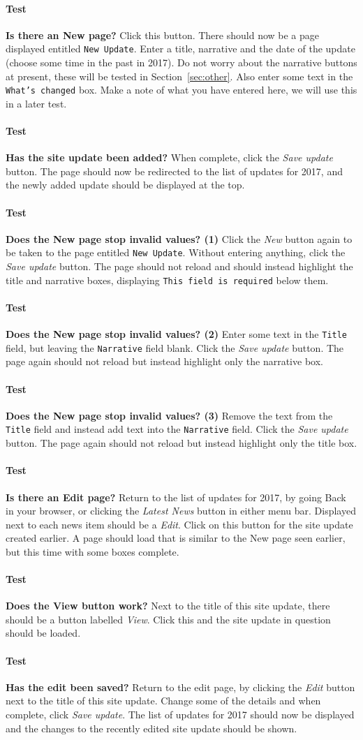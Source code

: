 \documentclass[12pt]{article}
\newcounter{Test}
\newcommand{\test}[1]{%
\stepcounter{Test}%
\paragraph{Test \theTest} \textbf{#1} }
\begin{document}
\test{Is there an New page?}
Click this button. There should now be a page displayed entitled \texttt{New Update}. Enter a title, narrative and the date of the update (choose some time in the past in 2017). Do not worry about the narrative buttons at present, these will be tested in Section~\ref{sec:other}. Also enter some text in the \texttt{What's changed} box. Make a note of what you have entered here, we will use this in a later test.

\test{Has the site update been added?}
When complete, click the \textit{Save update} button. The page should now be redirected to the list of updates for 2017, and the newly added update should be displayed at the top.

\test{Does the New page stop invalid values? (1)}
Click the \textit{New} button again to be taken to the page entitled \texttt{New Update}. Without entering anything, click the \textit{Save update} button. The page should not reload and should instead highlight the title and narrative boxes, displaying \texttt{This field is required} below them.

\test{Does the New page stop invalid values? (2)}
Enter some text in the \texttt{Title} field, but leaving the \texttt{Narrative} field blank. Click the \textit{Save update} button. The page again should not reload but instead highlight only the narrative box.

\test{Does the New page stop invalid values? (3)}
Remove the text from the \texttt{Title} field and instead add text into the \texttt{Narrative} field. Click the \textit{Save update} button. The page again should not reload but instead highlight only the title box.

\test{Is there an Edit page?}
Return to the list of updates for 2017, by going Back in your browser, or clicking the \textit{Latest News} button in either menu bar. Displayed next to each news item should be a \textit{Edit}. Click on this button for the site update created earlier. A page should load that is similar to the New page seen earlier, but this time with some boxes complete.

\test{Does the View button work?}
Next to the title of this site update, there should be a button labelled \textit{View}. Click this and the site update in question should be loaded.

\test{Has the edit been saved?}
Return to the edit page, by clicking the \textit{Edit} button next to the title of this site update. Change some of the details and when complete, click \textit{Save update}. The list of updates for 2017 should now be displayed and the changes to the recently edited site update should be shown.
\end{document}
